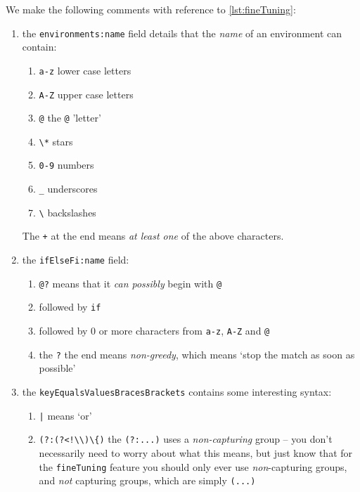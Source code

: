 \documentclass[10pt]{article}
\begin{document}
 We make the following comments with reference to \cref{lst:fineTuning}:
 \begin{enumerate}
  \item the \texttt{environments:name} field details that the \emph{name} of an
        environment can contain:
        \begin{enumerate}
         \item \texttt{a-z} lower case letters
         \item \texttt{A-Z} upper case letters
         \item \texttt{@} the \texttt{@} 'letter'
         \item \lstinline!\*! stars
         \item \texttt{0-9} numbers
         \item \lstinline!_! underscores
         \item \lstinline!\! backslashes
        \end{enumerate}
        The \texttt{+} at the end means \emph{at least one} of the above characters.
  \item the \texttt{ifElseFi:name} field:
        \begin{enumerate}
         \item \lstinline^@?^ means that it \emph{can possibly} begin with
               \lstinline^@^
         \item followed by \texttt{if}
         \item followed by 0 or more characters from \texttt{a-z}, \texttt{A-Z} and
               \texttt{@}
         \item the \texttt{?} the end means \emph{non-greedy}, which means `stop the
               match as soon as possible'
        \end{enumerate}
  \item the \texttt{keyEqualsValuesBracesBrackets} contains some interesting syntax:
        \begin{enumerate}
         \item \lstinline!|! means `or'
         \item \lstinline^(?:(?<!\\)\{)^ the \lstinline^(?:...)^ uses a \emph{non-capturing} group -- you don't necessarily need to worry about what this
               means, but just know that for the \texttt{fineTuning} feature you should only ever use
               \emph{non}-capturing groups, and \emph{not} capturing groups, which are simply
               \lstinline!(...)!

\end{enumerate}
\end{enumerate}
\end{document}
